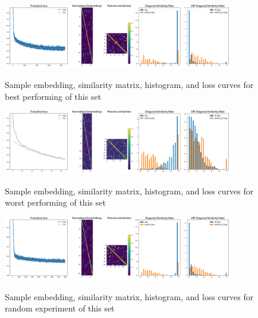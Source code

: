 \documentclass[a4paper]{article}
\begin{document}
\begin{figure}[H]
  \includegraphics[width=0.9\textwidth]{figures/pairwise5view5-longskip0-load-true-1}
  \label{fig:pairwise5view5-longskip0-load-true-1-sub1}
  \caption{Sample embedding, similarity matrix, histogram, and loss curves for best performing of this set}
\end{figure}
\begin{figure}[H]
  \includegraphics[width=0.9\textwidth]{figures/6view-longskip0-load-true-0}
  \label{fig:6view-longskip0-load-true-0-sub1}
  \caption{Sample embedding, similarity matrix, histogram, and loss curves for worst performing of this set}
\end{figure}
\begin{figure}[H]
  \includegraphics[width=0.9\textwidth]{figures/pairwise3view5-longskip1-load-true-1}
  \label{fig:pairwise3view5-longskip1-load-true-1-sub1}
  \caption{Sample embedding, similarity matrix, histogram, and loss curves for random experiment of this set}
\end{figure}
\end{document}

